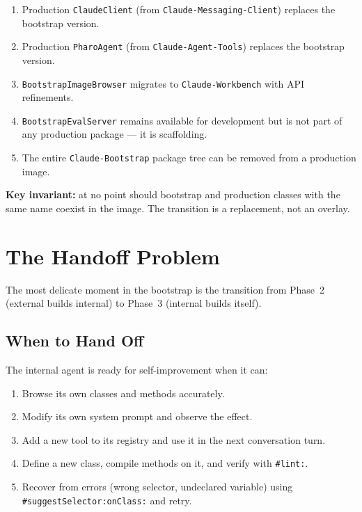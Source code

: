 \documentclass[a4paper,10pt,fleqn]{article}
\newcommand{\cls}[1]{\texttt{#1}}
\newcommand{\sel}[1]{\texttt{\##1}}
\newcommand{\pkg}[1]{\texttt{#1}}
\begin{document}
\begin{enumerate}
  \item Production \cls{ClaudeClient} (from \pkg{Claude-Messaging-Client})
    replaces the bootstrap version.
  \item Production \cls{PharoAgent} (from \pkg{Claude-Agent-Tools})
    replaces the bootstrap version.
  \item \cls{BootstrapImageBrowser} migrates to \pkg{Claude-Workbench}
    with API refinements.
  \item \cls{BootstrapEvalServer} remains available for development but is
    not part of any production package --- it is scaffolding.
  \item The entire \pkg{Claude-Bootstrap} package tree can be removed
    from a production image.
\end{enumerate}

\textbf{Key invariant:} at no point should bootstrap and production
classes with the same name coexist in the image.  The transition is
a replacement, not an overlay.

\section{The Handoff Problem}

The most delicate moment in the bootstrap is the transition from
Phase~2 (external builds internal) to Phase~3 (internal builds itself).

\subsection{When to Hand Off}

The internal agent is ready for self-improvement when it can:

\begin{enumerate}
  \item Browse its own classes and methods accurately.
  \item Modify its own system prompt and observe the effect.
  \item Add a new tool to its registry and use it in the next
    conversation turn.
  \item Define a new class, compile methods on it, and verify with
    \sel{lint:}.
  \item Recover from errors (wrong selector, undeclared variable) using
    \sel{suggestSelector:onClass:} and retry.
\end{enumerate}
\end{document}
